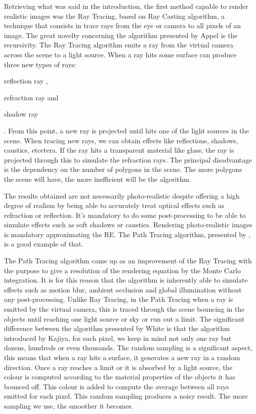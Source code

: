 \documentclass[titlepage,12pt]{report}
\begin{document}
Retrieving what was said in the introduction, the first method capable to render realistic images was the Ray Tracing, based on Ray Casting algorithm, a technique that consists in trace rays from the eye or camera to all pixels of an image. The great novelty concerning the algorithm presented by Appel is the recursivity. The Ray Tracing algorithm emits a ray from the virtual camera across the scene to a light source. When a ray hits some surface can produce three new types of rays: \begin{enumerate*}[label=\roman*)] \item
 reflection ray \label{ray:reflected}, \item
 refraction ray and \item
 shadow ray\end{enumerate*}. From this point, a new ray is projected until hits one of the light sources in the scene. When tracing new rays, we can obtain effects like reflections, shadows, caustics, etcetera. If the ray hits a transparent material like glass, the ray is projected through this to simulate the refraction rays. The principal disadvantage is the dependency on the number of polygons in the scene. The more polygons the scene will have, the more inefficient will be the algorithm.

The results obtained are not necessarily photo-realistic despite offering a high degree of realism by being able to accurately treat optical effects such as refraction or reflection. It's mandatory to do some post-processing to be able to simulate effects such as soft shadows or caustics. Rendering photo-realistic images is mandatory approximating the RE. The Path Tracing algorithm, presented by \citep[pp. ~143--150]{Kajiya1986}, is a good example of that.

The Path Tracing algorithm came up as an improvement of the Ray Tracing with the purpose to give a resolution of the rendering equation by the Monte Carlo integration. It is for this reason that the algorithm is inherently able to simulate effects such as motion blur, ambient occlusion and global illumination without any post-processing. Unlike Ray Tracing, in the Path Tracing when a ray is emitted by the virtual camera, this is traced through the scene bouncing in the objects until reaching one light source or sky or run out a limit. The significant difference between the algorithm presented by White is that the algorithm introduced by Kajiya, for each pixel, we keep in mind not only one ray but dozens, hundreds or even thousands. The random sampling is a significant aspect, this means that when a  ray hits a surface, it generates a new ray in a random direction. Once a ray reaches a limit or it is absorbed by a light source, the colour is computed according to the material properties of the objects it has bounced off. This colour is added to compute the average between all rays emitted for each pixel. This random sampling produces a noisy result. The more sampling we use, the smoother it becomes.
\end{document}
